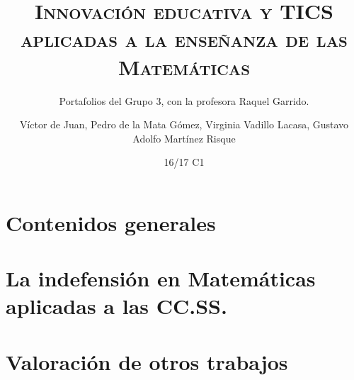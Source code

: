 \documentclass[palatino,nochap,miniheader,nobuilddate]{apuntesURJC}
\title{\textsc{Innovación educativa y TICS aplicadas a la enseñanza de las Matemáticas}}
\subtitle{Portafolios del Grupo 3, con la profesora Raquel Garrido.}
\author{Víctor de Juan,
Pedro de la Mata Gómez,
Virginia Vadillo Lacasa,
Gustavo Adolfo Martínez Risque}
\date{16/17 C1}
\begin{document}
\pagestyle{plain}



\maketitle

\tableofcontents
\newpage

\chapter{Contenidos generales}


\chapter{La indefensión en Matemáticas aplicadas a las CC.SS.}


\chapter{Valoración de otros trabajos}


\printindex
\end{document}

